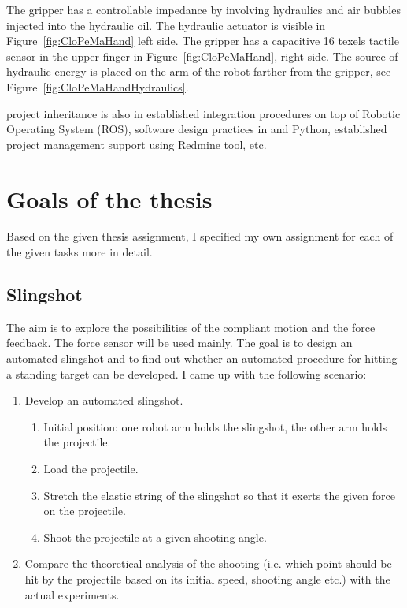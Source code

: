        The gripper has a controllable impedance by involving hydraulics and air bubbles injected into the hydraulic oil. The hydraulic actuator is visible in Figure~\ref{fig:CloPeMaHand} left side. The gripper has a capacitive 16 texels tactile sensor in the upper finger in Figure~\ref{fig:CloPeMaHand}, right side. The source of hydraulic energy is placed on the arm of the robot farther from the gripper, see Figure~\ref{fig:CloPeMaHandHydraulics}.

        \CloPeMa\/ project inheritance is also in established integration procedures on top of Robotic Operating System (ROS), software design practices in  \Cplusplus\/ and Python, established project management support using Redmine tool, etc.

    \section{Goals of the thesis}
    Based on the given thesis assignment, I specified my own assignment for each of the given tasks more in detail.

        \subsection{Slingshot}
        The aim is to explore the possibilities of the compliant motion and the force feedback. The force sensor will be used mainly. The goal is to design an automated slingshot and to find out whether an automated procedure for hitting a standing target can be developed. I came up with the following scenario:
            \begin{enumerate}
                \item Develop an automated slingshot.
%
                \begin{enumerate}
                    \item Initial position: one robot arm holds the slingshot, the other arm holds the projectile.
                    \item Load the projectile.
                    \item Stretch the elastic string of the slingshot so that it exerts the given force on the projectile.
                    \item Shoot the projectile at a given shooting angle.
                \end{enumerate}
%
                \item Compare the theoretical analysis of the shooting (i.e. which point should be hit by the projectile based on its initial speed, shooting angle etc.) with the actual experiments.
            \end{enumerate}


